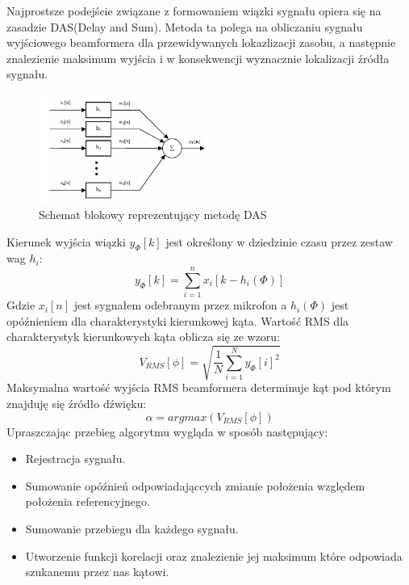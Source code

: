 \documentclass[eng,printmode]{mgr}
\begin{document}
Najprostsze podejście związane z formowaniem wiązki sygnału opiera się na zasadzie DAS(Delay and Sum). Metoda ta polega na obliczaniu sygnału wyjściowego beamformera dla przewidywanych lokazlizacji zasobu, a następnie znalezienie maksimum wyjścia i w konsekwencji wyznacznie lokalizacji źródła sygnału.
\begin{figure}[ht]

    \centering

  \includegraphics[width=0.5\textwidth, angle=0]{DAS.png}

    \caption{Schemat blokowy reprezentujący metodę DAS}

    

\end{figure}
\newline 
Kierunek wyjścia wiązki $y_{\Phi}[k]$ jest określony w dziedzinie czasu przez zestaw wag $h_{i}$:
\begin{equation}
 y_{\Phi}[k] = \sum_{i=1}^n x_{i}[k-h_{i}(\Phi)] 
\end{equation}
Gdzie $x_{i}[n]$ jest sygnałem odebranym przez mikrofon a $h_{i}(\Phi)$ jest opóźnieniem dla charakterystyki kierunkowej kąta.
Wartość RMS dla charakterystyk kierunkowych kąta oblicza się ze wzoru:
\begin{equation}
 V_{RMS}[\phi] = \sqrt{\frac{1}{N}\sum_{i=1}^N y_{\Phi}[i]^2 }
\end{equation}
Maksymalna wartość wyjścia RMS beamformera determinuje kąt pod którym znajduję się źródło dźwięku:
\begin{equation}
 \alpha = argmax(V_{RMS}[\phi])
\end{equation}
 Upraszczając przebieg algorytmu wygląda w sposób następujący:
 \begin{itemize}
\item Rejestracja sygnału.
\item Sumowanie opóźnień odpowiadająccych zmianie położenia względem położenia referencyjnego. 
\item Sumowanie przebiegu dla każdego sygnału.
\item Utworzenie funkcji korelacji oraz znalezienie jej maksimum które odpowiada szukanemu przez nas kątowi.
\end{itemize}
\end{document}
